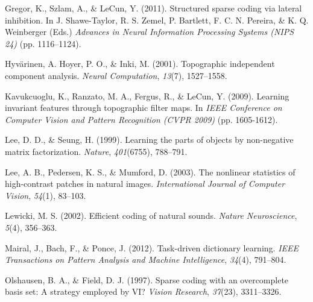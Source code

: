 \documentclass{article} %
\begin{document}
\begin{thebibliography}{100}
Gregor, K., Szlam, A., \& LeCun, Y. (2011).
\newblock Structured sparse coding via lateral inhibition. 
\newblock In J. Shawe-Taylor, R. S. Zemel, P. Bartlett, F. C. N. Pereira, \& K. Q. Weinberger (Eds.) \emph{Advances in Neural Information Processing Systems (NIPS 24)} (pp. 1116--1124). %

Hyv{\"a}rinen, A. Hoyer, P. O., \& Inki, M.  (2001).
\newblock Topographic independent component analysis. 
\newblock \emph{Neural Computation}, \emph{13}(7), 1527--1558.

Kavukcuoglu, K., Ranzato, M. A., Fergus, R., \& LeCun, Y. (2009). 
\newblock Learning invariant features through topographic filter maps. 
\newblock In \emph{IEEE Conference on Computer Vision and Pattern Recognition (CVPR 2009)} (pp. 1605-1612).


Lee, D. D., \& Seung, H. (1999). 
\newblock Learning the parts of objects by non-negative matrix factorization. 
\newblock \emph{Nature}, \emph{401}(6755), 788--791.

Lee, A. B., Pedersen, K. S., \& Mumford, D. (2003). 
\newblock The nonlinear statistics of high-contrast patches in natural images. 
\newblock \emph{International Journal of Computer Vision}, \emph{54}(1), 83--103.

Lewicki, M. S. (2002). 
\newblock Efficient coding of natural sounds. 
\newblock \emph{Nature Neuroscience}, \emph{5}(4), 356--363.

Mairal, J., Bach, F., \& Ponce, J. (2012). 
\newblock Task-driven dictionary learning. 
\newblock \emph{IEEE Transactions on Pattern Analysis and Machine Intelligence}, \emph{34}(4), 791--804.

Olshausen, B. A., \& Field, D. J. (1997). 
\newblock Sparse coding with an overcomplete basis set: A strategy employed by VI?
\newblock \emph{Vision Research}, \emph{37}(23), 3311--3326.


\end{thebibliography}
\end{document}
